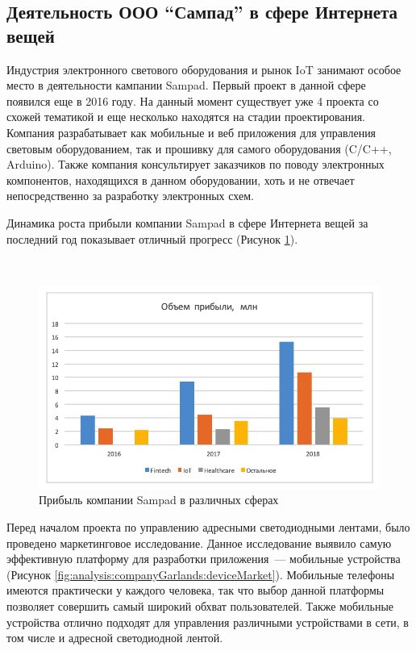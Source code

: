 \subsection{Деятельность ООО \enquote{Сампад} в сфере Интернета вещей}
\label{sec:develop:companyGarlands}

Индустрия электронного светового оборудования и рынок IoT занимают особое место в деятельности кампании Sampad. Первый проект в данной сфере появился еще в 2016 году. На данный момент существует уже 4 проекта со схожей тематикой и еще несколько находятся на стадии проектирования. Компания разрабатывает как мобильные и веб приложения для управления световым оборудованием, так и прошивку для самого оборудования (C/C++, Arduino). Также компания консультирует заказчиков по поводу электронных компонентов, находящихся в данном оборудовании, хоть и не отвечает непосредственно за разработку электронных схем.

Динамика роста прибыли компании Sampad в сфере Интернета вещей за последний год показывает отличный прогресс (Рисунок \ref{fig:analysis:companyGarlands:sampadIncome}).

~
\begin{figure}[H]
\centering
	\includegraphics[scale=1]{figures/sampadIncome.png}
	\caption{Прибыль компании Sampad в различных сферах}
	\label{fig:analysis:companyGarlands:sampadIncome}
\end{figure}

Перед началом проекта по управлению адресными светодиодными лентами, было проведено маркетинговое исследование. Данное исследование выявило самую эффективную платформу для разработки приложения~--- мобильные устройства (Рисунок \ref{fig:analysis:companyGarlands:deviceMarket}). Мобильные телефоны имеются практически у каждого человека, так что выбор данной платформы позволяет совершить самый широкий обхват пользователей. Также мобильные устройства отлично подходят для управления различными устройствами в сети, в том числе и адресной светодиодной лентой.

